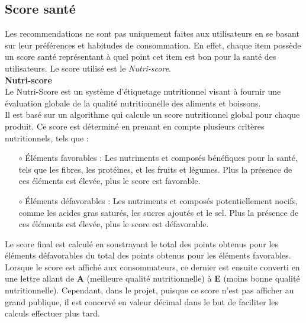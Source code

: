 \documentclass[11pt]{article}
\begin{document}
\subsection{Score santé}
Les recommendations ne sont pas uniquement faites aux utilisateurs en se basant sur leur préférences et habitudes de consommation. En effet, chaque item possède un score santé représentant à quel point cet item est bon pour la santé des utilisateurs. Le score utilisé est le \textit{Nutri-score}.\\

\textbf{Nutri-score}\\

Le Nutri-Score est un système d'étiquetage nutritionnel visant à fournir une évaluation globale de la qualité nutritionnelle des aliments et boissons.\\

Il est basé sur un algorithme qui calcule un score nutritionnel global pour chaque produit. Ce score est déterminé en prenant en compte plusieurs critères nutritionnels, tels que :\\

\begin{itemize}
    \item[$\circ$] Éléments favorables : Les nutriments et composés bénéfiques pour la santé, tels que les fibres, les protéines, et les fruits et légumes. Plus la présence de ces éléments est élevée, plus le score est favorable.\\
    
    \item[$\circ$] Éléments défavorables : Les nutriments et composés potentiellement nocifs, comme les acides gras saturés, les sucres ajoutés et le sel. Plus la présence de ces éléments est élevée, plus le score est défavorable.\\
\end{itemize}

Le score final est calculé en soustrayant le total des points obtenus pour les éléments défavorables du total des points obtenus pour les éléments favorables. Lorsque le score est affiché aux consommateurs, ce dernier est ensuite converti en une lettre allant de \textbf{A} (meilleure qualité nutritionnelle) à \textbf{E} (moins bonne qualité nutritionnelle). Cependant, dans le projet, puisque ce score n'est pas afficher au grand publique, il est concervé en valeur décimal dans le but de faciliter les calculs effectuer plus tard.\\
\end{document}
